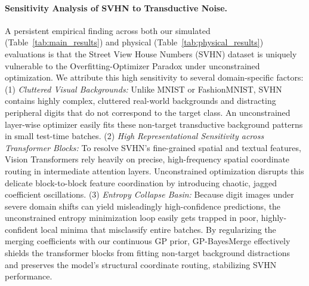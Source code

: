 \paragraph{Sensitivity Analysis of SVHN to Transductive Noise.}
A persistent empirical finding across both our simulated
(Table~\ref{tab:main_results}) and physical (Table~\ref{tab:physical_results})
evaluations is that the Street View House Numbers (SVHN) dataset is uniquely
vulnerable to the Overfitting-Optimizer Paradox under unconstrained
optimization. We attribute this high sensitivity to several domain-specific
factors: (1) \emph{Cluttered Visual Backgrounds:} Unlike MNIST or FashionMNIST,
SVHN contains highly complex, cluttered real-world backgrounds and distracting
peripheral digits that do not correspond to the target class. An unconstrained
layer-wise optimizer easily fits these non-target transductive background
patterns in small test-time batches. (2) \emph{High Representational Sensitivity
across Transformer Blocks:} To resolve SVHN's fine-grained spatial and textual
features, Vision Transformers rely heavily on precise, high-frequency spatial
coordinate routing in intermediate attention layers. Unconstrained optimization
disrupts this delicate block-to-block feature coordination by introducing
chaotic, jagged coefficient oscillations. (3) \emph{Entropy Collapse Basin:}
Because digit images under severe domain shifts can yield misleadingly
high-confidence predictions, the unconstrained entropy minimization loop easily
gets trapped in poor, highly-confident local minima that misclassify entire
batches. By regularizing the merging coefficients with our continuous GP prior,
GP-BayesMerge effectively shields the transformer blocks from fitting non-target
background distractions and preserves the model's structural coordinate routing,
stabilizing SVHN performance.

